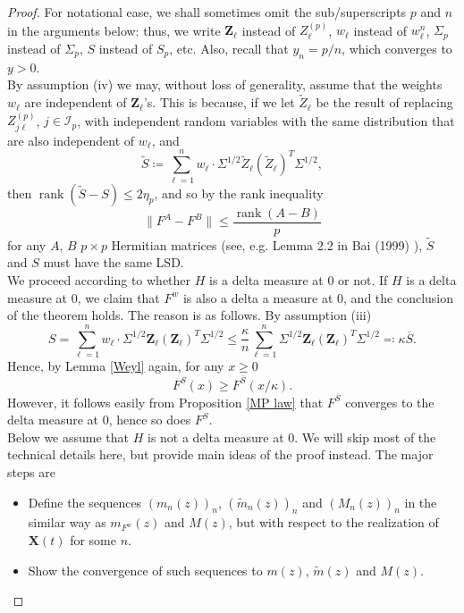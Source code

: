 \documentclass[a4paper,11pt]{book}
\theoremstyle{plain}
\theoremstyle{definition}
\begin{document}
    \begin{proof}
    	For notational ease, we shall sometimes omit the sub/superscripts $p$ and $n$ in the arguments below: thus, we write $\mathbf{Z}_\ell$ instead of $Z_\ell^{(p)}$, $w_\ell$ instead of $w_\ell^n$, $\Sigma_p$ instead of $\Sigma_p$, $S$ instead of $S_p$, etc. Also, recall that $y_n = p/n$, which converges to $y > 0$. \\
    	By assumption (iv) we may, without loss of generality, assume that the weights $w_\ell$ are independent of $\mathbf{Z}_\ell$'s. This is because, if we let $\widetilde{Z}_\ell$ be the result of replacing $Z_{j \ell}^{(p)}$, $j \in \mathcal{I}_p$, with independent random variables with the same distribution that are also independent of $w_\ell$, and
    	\[ \widetilde{S}\coloneqq \sum_{\ell=1}^{n} w_\ell \cdot \Sigma^{1/2} \widetilde{Z}_\ell (\widetilde{Z}_\ell)^T \Sigma^{1/2}, \]
    	then $\operatorname{rank}(\widetilde{S}-S) \leq 2 \eta_p$, and so by the rank inequality
    	\[ \| F^A - F^B \| \leq \frac{\operatorname{rank}(A-B)}{p} \]
    	for any $A$, $B$ $p \times p$ Hermitian matrices (see, e.g. Lemma 2.2 in Bai (1999) \cite{Bai}), $\widetilde{S}$ and $S$ must have the same LSD. \\
    	We proceed according to whether $H$ is a delta measure at $0$ or not. If $H$ is a delta measure at $0$, we claim that $F^w$ is also a delta a measure at $0$, and the conclusion of the theorem holds. The reason is as follows. By assumption (iii) 
    	\[ S = \sum_{\ell = 1}^{n} w_\ell \cdot \Sigma^{1/2} \mathbf{Z}_\ell (\mathbf{Z}_\ell)^T \Sigma^{1/2} \leq \frac{\kappa}{n} \sum_{\ell=1}^{n}\Sigma^{1/2} \mathbf{Z}_\ell (\mathbf{Z}_\ell)^T \Sigma^{1/2} \eqqcolon \kappa \overline{S}.   \]
    	Hence, by Lemma \ref{Weyl} again, for any $x \geq 0$
    	\[ F^S(x) \geq F^{\overline{S}}(x/\kappa). \]
    	However, it follows easily from Proposition \ref{MP law} that $F^{\overline{S}}$ converges to the delta measure at $0$, hence so does $F^S$. \\
    	Below we assume that $H$ is not a delta measure at $0$. 
    	We will skip most of the technical details here, but provide main ideas of the proof instead. The major steps are
    	\begin{itemize}
    		\item Define the sequences $(m_n(z))_n$, $(\widetilde{m}_n(z))_n$ and $(M_n(z))_n$ in the similar way as $m_{F^w}(z)$ and $M(z)$, but with respect to the realization of $\mathbf{X}(t)$ for some $n$.
    		\item Show the convergence of such sequences to $m(z)$, $\widetilde{m}(z)$ and $M(z)$.

\end{itemize}
\end{proof}
\end{document}
